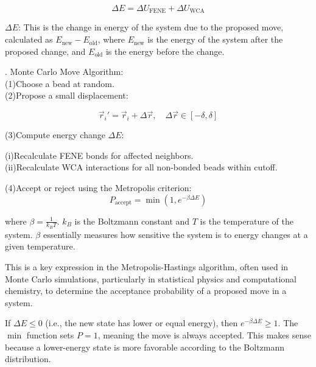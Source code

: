 \documentclass[12pt]{article}
\begin{document}
\begin{flushleft}
\begin{equation}
\Delta E = \Delta U_{\text{FENE}} + \Delta U_{\text{WCA}}
\end{equation}




\textbf{$\Delta E$}: This is the change in energy of the system due to the proposed move, calculated as $E_{\text{new}} - E_{\text{old}}$, where $E_{\text{new}}$ is the energy of the system after the proposed change, and $E_{\text{old}}$ is the energy before the change.


. Monte Carlo Move Algorithm:\\ 

\setlength{\parindent}{6em}(1)Choose a bead at random.\\
(2)Propose a small displacement:
    
\begin{equation}
    \vec{r}_i' = \vec{r}_i + \Delta \vec{r}, \quad \Delta \vec{r} \in [-\delta, \delta] 
\end{equation}

  
\setlength{\parindent}{6em}(3)Compute energy change $\Delta E$:
\setlength{\parindent}{0pt} 

\setlength{\parindent}{100pt}(i)Recalculate FENE bonds for affected neighbors.\\
(ii)Recalculate WCA interactions for all non-bonded beads within cutoff.\\
\setlength{\parindent}{0pt}


\setlength{\parindent}{6em}(4)Accept or reject using the Metropolis criterion:
\setlength{\parindent}{0pt}
\begin{equation}
P_{\text{accept}} = \min \left(1, e^{-\beta \Delta E}\right)
\end{equation}

where $\beta = \frac{1}{k_B T}$. $k_B$ is the Boltzmann constant and $T$ is the temperature of the system. $\beta$ essentially measures how sensitive the system is to energy changes at a given temperature.

\setlength{\parindent}{45pt}

This is a key expression in the Metropolis-Hastings algorithm, often used in Monte Carlo simulations, particularly in statistical physics and computational chemistry, to determine the acceptance probability of a proposed move in a system.




If $\Delta E \leq 0$ (i.e., the new state has lower or equal energy), then $e^{-\beta \Delta E} \geq 1$. The $\min$ function sets $P = 1$, meaning the move is always accepted. This makes sense because a lower-energy state is more favorable according to the Boltzmann distribution.


\end{flushleft}
\end{document}
